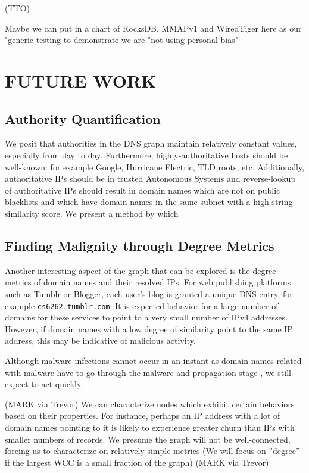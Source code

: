 \documentclass{acm_proc_article-sp}
\begin{document}
(TTO)


Maybe we can put in a chart of RocksDB, MMAPv1 and WiredTiger here as our "generic testing to demonstrate we are "not using personal bias"


\section{FUTURE WORK}


\subsection{Authority Quantification}
We posit that authorities in the DNS graph maintain relatively constant values, especially from day to day. Furthermore, highly-authoritative hosts should be well-known: for example Google, Hurricane Electric, TLD roots, etc. Additionally, authoritative IPs should be in trusted Autonomous Systems and reverse-lookup of authoritative IPs should result in domain names which are not on public blacklists and which have domain names in the same subnet with a high string-similarity score. We present a method by which 

\subsection{Finding Malignity through Degree Metrics}
Another interesting aspect of the graph that can be explored is the degree metrics of domain names and their resolved IPs. For web publishing platforms such as Tumblr or Blogger, each user's blog is granted a unique DNS entry, for example \texttt{cs6262.tumblr.com}. It is expected behavior for a large number of domains for these services to point to a very small number of IPv4 addresses. However, if domain names with a low degree of similarity point to the same IP address, this may be indicative of malicious activity.

Although malware infections cannot occur in an instant as domain names related with malware have to go through the malware and propagation stage \cite{Manos2012Auth}, we still expect to act quickly.

(MARK via Trevor)
We can characterize nodes which exhibit certain behaviors based on their properties. For instance, perhaps an IP address with a lot of domain names pointing to it is likely to experience greater churn than IPs with smaller numbers of records. We presume the graph will not be well-connected, forcing us to characterize on relatively simple metrics (We will focus on ''degree'' if the largest WCC is a small fraction of the graph)
(MARK via Trevor)
\end{document}

